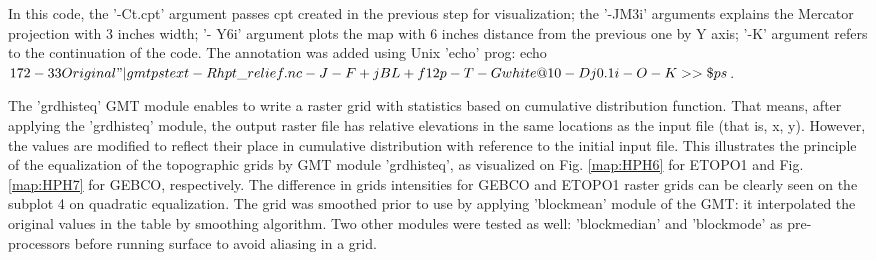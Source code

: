 \documentclass[11pt,a4paper]{report}
\begin{document}
{In this code, the ’-Ct.cpt’ argument passes cpt created in the previous step for visualization; the '-JM3i' arguments explains the Mercator projection with 3 inches width; '- Y6i' argument plots the map with 6 inches distance from the previous one by Y axis; '-K' argument refers to the continuation of the code. The annotation was added using Unix 'echo' prog: echo $172 -33 Original" | gmt pstext -Rhpt\_relief.nc -J -F+jBL+f12p -T -Gwhite@10 -Dj0.1i -O -K >> \$ps$. 

The 'grdhisteq' \ac{GMT} module enables to write a raster grid with statistics based on cumulative distribution function. That means, after applying the 'grdhisteq' module, the output raster file has relative elevations in the same locations as the input file (that is, x, y). However, the values are modified to reflect their place in cumulative distribution with reference to the initial input file. This illustrates the principle of the equalization of the topographic grids by \ac{GMT} module 'grdhisteq', as visualized on Fig. \ref{map:HPH6} for \ac{ETOPO1} and Fig. \ref{map:HPH7} for \ac{GEBCO}, respectively. The difference in grids intensities for \ac{GEBCO} and \ac{ETOPO1} raster grids can be clearly seen on the subplot 4 on quadratic equalization. The grid was smoothed prior to use by applying 'blockmean' module of the \ac{GMT}: it interpolated the original values in the table by smoothing algorithm. Two other modules were tested as well: 'blockmedian' and 'blockmode' as pre-processors before running surface to avoid aliasing in a grid.

}
\end{document}
